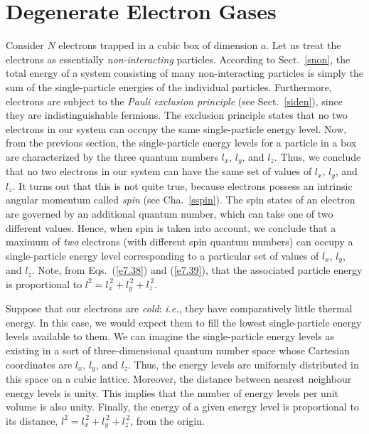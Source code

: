 \section{Degenerate Electron Gases}
Consider $N$ electrons trapped in a cubic box of dimension $a$. Let us
treat the electrons as essentially {\em non-interacting}\/ particles. According to Sect.~\ref{snon}, 
the total energy of a system consisting of many non-interacting particles is simply the sum of the single-particle energies of the individual
particles. Furthermore, electrons are subject to
the {\em Pauli exclusion principle}\/ (see Sect.~\ref{siden}), since
they are indistinguishable fermions. The exclusion principle
states that no two electrons in our system can occupy the same single-particle
energy level. Now, from the previous section, the single-particle
energy levels for a particle in a box are characterized by the three quantum numbers
$l_x$, $l_y$, and $l_z$. Thus, we conclude that no two electrons in
our system can have the same set of values of $l_x$, $l_y$, and $l_z$. It
turns out that this is not quite true, because electrons possess an intrinsic
angular momentum called {\em spin} (see Cha.~\ref{sspin}). The spin states of an electron are
governed by an additional quantum number, which can take one of two different
values. Hence, when spin is taken into account, we conclude that
a maximum of {\em two}\/ electrons (with different spin quantum numbers) can occupy
a single-particle energy level corresponding to a particular set of values of $l_x$, $l_y$,
and $l_z$. Note, from Eqs.~(\ref{e7.38}) and (\ref{e7.39}), that the associated particle energy is
proportional to $l^2 = l_x^{\,2} + l_y^{\,2}+ l_z^{\,2}$.

Suppose that our electrons are {\em cold}: {\em i.e.}, they have comparatively
little thermal energy. In this case, we would expect them
to fill the lowest single-particle energy levels available to them. We can imagine  the single-particle energy levels as existing in a sort of three-dimensional quantum number space whose Cartesian coordinates are
$l_x$, $l_y$, and $l_z$. Thus, the energy levels are uniformly
distributed in this space on a cubic lattice. Moreover, the distance between
nearest neighbour energy levels is unity. This implies that the
number of energy levels per unit volume is also unity. Finally, the energy of a given energy
level
is proportional to its distance, $l^2 = l_x^{\,2} + l_y^{\,2}+ l_z^{\,2}$,
from the origin.


